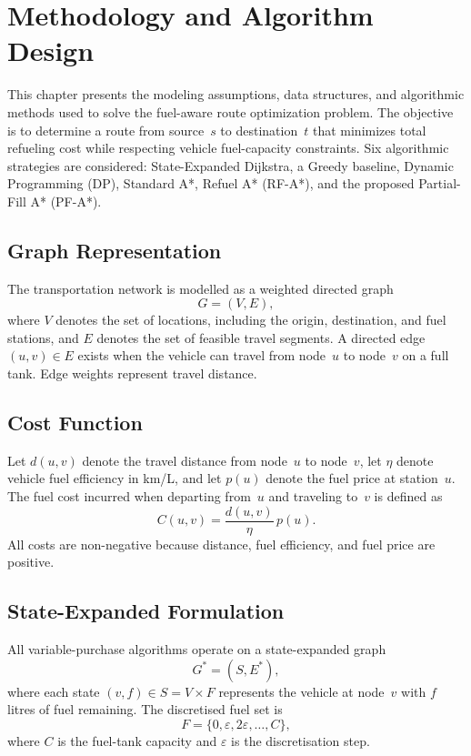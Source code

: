 \chapter{Methodology and Algorithm Design}
\label{ch:algorithms}

This chapter presents the modeling assumptions, data structures, and algorithmic methods used to solve the fuel-aware route optimization problem. The objective is to determine a route from source~$s$ to destination~$t$ that minimizes total refueling cost while respecting vehicle fuel-capacity constraints. Six algorithmic strategies are considered: State-Expanded Dijkstra, a Greedy baseline, Dynamic Programming (DP), Standard A*, Refuel A* (RF-A*), and the proposed Partial-Fill A* (PF-A*).

\section{Graph Representation}

The transportation network is modelled as a weighted directed graph
\[
G=(V,E),
\]
where $V$ denotes the set of locations, including the origin, destination, and fuel stations, and $E$ denotes the set of feasible travel segments. A directed edge $(u,v) \in E$ exists when the vehicle can travel from node~$u$ to node~$v$ on a full tank. Edge weights represent travel distance.

\section{Cost Function}

Let $d(u,v)$ denote the travel distance from node~$u$ to node~$v$, let $\eta$ denote vehicle fuel efficiency in km/L, and let $p(u)$ denote the fuel price at station~$u$. The fuel cost incurred when departing from~$u$ and traveling to~$v$ is defined as
\[
C(u,v)=\frac{d(u,v)}{\eta}\,p(u).
\]
All costs are non-negative because distance, fuel efficiency, and fuel price are positive.

\section{State-Expanded Formulation}
\label{sec:state_expanded}

All variable-purchase algorithms operate on a state-expanded graph
\[
G^{*}=(S,E^{*}),
\]
where each state $(v,f)\in S=V\times F$ represents the vehicle at node~$v$ with $f$ litres of fuel remaining. The discretised fuel set is
\[
F=\{0,\varepsilon,2\varepsilon,\ldots,C\},
\]
where $C$ is the fuel-tank capacity and $\varepsilon$ is the discretisation step.


